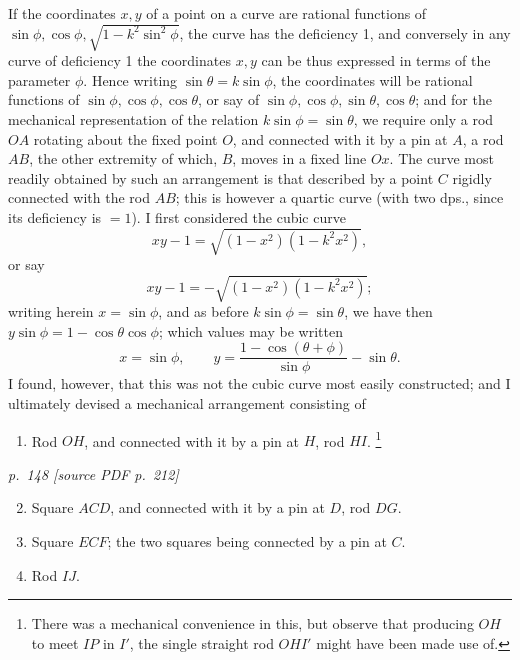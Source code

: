 \documentclass[11pt,a4paper]{article}
\newcommand{\sourcepage}[2]{%
  \bigskip
  \noindent\textit{p.~#1 [source PDF p.~#2]}%
  \par\smallskip
}
\begin{document}
If the coordinates \(x,y\) of a point on a curve are rational functions of
\(\sin\phi,\cos\phi,\sqrt{1-k^2\sin^2\phi}\), the curve has the deficiency 1, and
conversely in any curve of deficiency 1 the coordinates \(x,y\) can be thus expressed
in terms of the parameter \(\phi\). Hence writing \(\sin\theta=k\sin\phi\), the
coordinates will be rational functions of \(\sin\phi,\cos\phi,\cos\theta\), or say of
\(\sin\phi,\cos\phi,\sin\theta,\cos\theta\); and for the mechanical representation of
the relation \(k\sin\phi=\sin\theta\), we require only a rod \(OA\) rotating about the
fixed point \(O\), and connected with it by a pin at \(A\), a rod \(AB\), the other
extremity of which, \(B\), moves in a fixed line \(Ox\). The curve most readily
obtained by such an arrangement is that described by a point \(C\) rigidly connected
with the rod \(AB\); this is however a quartic curve (with two dps., since its
deficiency is \(=1\)). I first considered the cubic curve
\[
xy-1=\sqrt{(1-x^2)(1-k^2x^2)},
\]
or say
\[
xy-1=-\sqrt{(1-x^2)(1-k^2x^2)};
\]
writing herein \(x=\sin\phi\), and as before \(k\sin\phi=\sin\theta\), we have then
\(y\sin\phi=1-\cos\theta\cos\phi\); which values may be written
\[
x=\sin\phi,\qquad
y=\frac{1-\cos(\theta+\phi)}{\sin\phi}-\sin\theta.
\]
I found, however, that this was not the cubic curve most easily constructed; and I
ultimately devised a mechanical arrangement consisting of
\begin{enumerate}
\item Rod \(OH\), and connected with it by a pin at \(H\), rod \(HI\).%
\footnote{There was a mechanical convenience in this, but observe that producing
\(OH\) to meet \(IP\) in \(I'\), the single straight rod \(OHI'\) might have been made
use of.}
\end{enumerate}

\sourcepage{148}{212}

\begin{enumerate}
\setcounter{enumi}{1}
\item Square \(ACD\), and connected with it by a pin at \(D\), rod \(DG\).
\item Square \(ECF\); the two squares being connected by a pin at \(C\).
\item Rod \(IJ\).
\end{enumerate}
\end{document}
